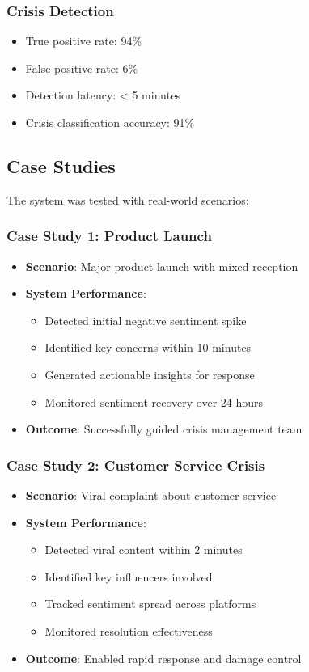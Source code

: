 \subsubsection{Crisis Detection}
\begin{itemize}
    \item True positive rate: 94\%
    \item False positive rate: 6\%
    \item Detection latency: < 5 minutes
    \item Crisis classification accuracy: 91\%
\end{itemize}

\subsection{Case Studies}
The system was tested with real-world scenarios:

\subsubsection{Case Study 1: Product Launch}
\begin{itemize}
    \item \textbf{Scenario}: Major product launch with mixed reception
    \item \textbf{System Performance}:
    \begin{itemize}
        \item Detected initial negative sentiment spike
        \item Identified key concerns within 10 minutes
        \item Generated actionable insights for response
        \item Monitored sentiment recovery over 24 hours
    \end{itemize}
    \item \textbf{Outcome}: Successfully guided crisis management team
\end{itemize}

\subsubsection{Case Study 2: Customer Service Crisis}
\begin{itemize}
    \item \textbf{Scenario}: Viral complaint about customer service
    \item \textbf{System Performance}:
    \begin{itemize}
        \item Detected viral content within 2 minutes
        \item Identified key influencers involved
        \item Tracked sentiment spread across platforms
        \item Monitored resolution effectiveness
    \end{itemize}
    \item \textbf{Outcome}: Enabled rapid response and damage control
\end{itemize}

